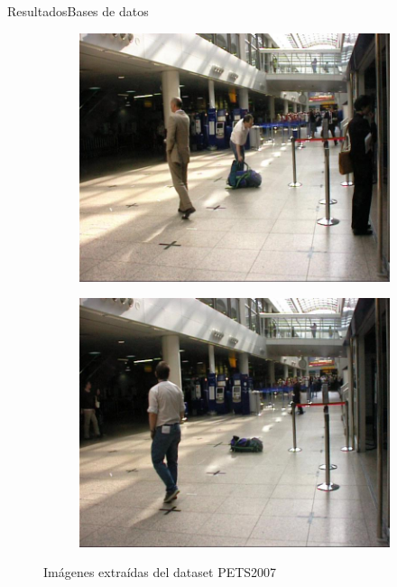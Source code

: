 \begin{frame}{Resultados}{Bases de datos}
\begin{figure}[ht]
  \centering
  \begin{subfigure}[b]{0.28\textwidth}
    \includegraphics[width=\textwidth]{Images/resultados/datasets/pets2007_1.jpg}
    \caption{}
    \label{fig:pets2007_1}
  \end{subfigure}
  \qquad
  \begin{subfigure}[b]{0.28\textwidth}
    \includegraphics[width=\textwidth]{Images/resultados/datasets/pets2007_2.jpg}
    \caption{}
    \label{fig:pets2007_2}
  \end{subfigure}
  \caption{Imágenes extraídas del dataset PETS2007}
  \label{fig:pets2007}
\end{figure}

\end{frame}


